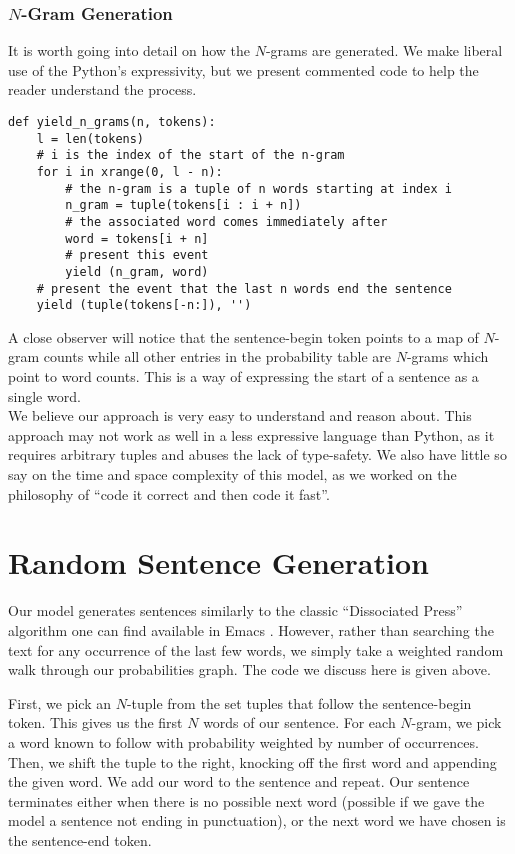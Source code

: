 \documentclass[12pt]{article}
\begin{document}
\subsubsection{$N$-Gram Generation}
It is worth going into detail on how the $N$-grams are generated. We make liberal use of the Python's expressivity, but we present commented code to help the reader understand the process.
\begin{lstlisting}
def yield_n_grams(n, tokens):
	l = len(tokens)
	# i is the index of the start of the n-gram
	for i in xrange(0, l - n):
	    # the n-gram is a tuple of n words starting at index i
		n_gram = tuple(tokens[i : i + n])
		# the associated word comes immediately after
		word = tokens[i + n]
		# present this event
		yield (n_gram, word)
	# present the event that the last n words end the sentence
	yield (tuple(tokens[-n:]), '')
\end{lstlisting}

A close observer will notice that the sentence-begin token points to a map of $N$-gram counts while all other entries in the probability table are $N$-grams which point to word counts. This is a way of expressing the start of a sentence as a single word.
\\

\noindent We believe our approach is very easy to understand and reason about. This approach may not work as well in a less expressive language than Python, as it requires arbitrary tuples and abuses the lack of type-safety. We also have little so say on the time and space complexity of this model, as we worked on the philosophy of ``code it correct and then code it fast''.

\section{Random Sentence Generation}
Our model generates sentences similarly to the classic ``Dissociated Press'' algorithm one can find available in Emacs \cite{Disp}. However, rather than searching the text for any occurrence of the last few words, we simply take a weighted random walk through our probabilities graph. The code we discuss here is given above.

First, we pick an $N$-tuple from the set tuples that follow the sentence-begin token. This gives us the first $N$ words of our sentence. For each $N$-gram, we pick a word known to follow with probability weighted by number of occurrences. Then, we shift the tuple to the right, knocking off the first word and appending the given word. We add our word to the sentence and repeat. Our sentence terminates either when there is no possible next word (possible if we gave the model a sentence not ending in punctuation), or the next word we have chosen is the sentence-end token. 
\end{document}
